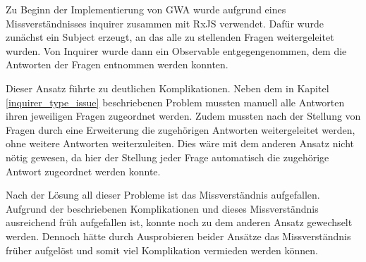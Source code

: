 Zu Beginn der Implementierung von \gls{GWA} wurde aufgrund eines Missverständnisses inquirer zusammen mit RxJS verwendet. Dafür wurde zunächst ein Subject erzeugt, an das alle zu stellenden Fragen weitergeleitet wurden. Von Inquirer wurde dann ein Observable entgegengenommen, dem die Antworten der Fragen entnommen werden konnten.

Dieser Ansatz führte zu deutlichen Komplikationen. Neben dem in Kapitel \ref{inquirer_type_issue} beschriebenen Problem mussten manuell alle Antworten ihren jeweiligen Fragen zugeordnet werden. Zudem mussten nach der Stellung von Fragen durch eine Erweiterung die zugehörigen Antworten weitergeleitet werden, ohne weitere Antworten weiterzuleiten. Dies wäre mit dem anderen Ansatz nicht nötig gewesen, da hier der Stellung jeder Frage automatisch die zugehörige Antwort zugeordnet werden konnte.

Nach der Lösung all dieser Probleme ist das Missverständnis aufgefallen. Aufgrund der beschriebenen Komplikationen und dieses Missverständnis ausreichend früh aufgefallen ist, konnte noch zu dem anderen Ansatz gewechselt werden. Dennoch hätte durch Ausprobieren beider Ansätze das Missverständnis früher aufgelöst und somit viel Komplikation vermieden werden können.